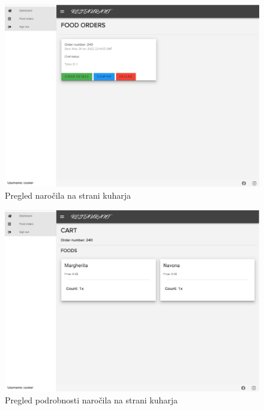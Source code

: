 \documentclass[a4paper, 12pt]{book}
\begin{document}
\begin{figure}
\centering
\includegraphics[width=12cm]{order_6.jpg}
\caption{Pregled naročila na strani kuharja}
\label{Opis4}
\end{figure}
\begin{figure}
\centering
\includegraphics[width=12cm]{order_7.jpg}
\caption{Pregled podrobnosti naročila na strani kuharja}
\label{Opis44}
\end{figure}
\end{document}
